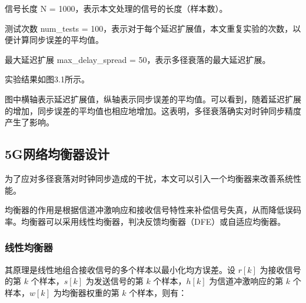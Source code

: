 \documentclass[UTF8,a4paper,12pt]{ctexart}
\numberwithin{equation}{section}
\begin{document}
	信号长度 N = 1000，表示本文处理的信号的长度（样本数）。
	
	测试次数 num\_tests = 100，表示对于每个延迟扩展值，本文重复实验的次数，以便计算同步误差的平均值。
	
	最大延迟扩展 max\_delay\_spread = 50，表示多径衰落的最大延迟扩展。
	
	实验结果如图3.1所示。
	\begin{figure}[htb] 
	\end{figure}
	
	图中横轴表示延迟扩展值，纵轴表示同步误差的平均值。可以看到，随着延迟扩展的增加，同步误差的平均值也相应地增加。这表明，多径衰落确实对时钟同步精度产生了影响。
	\subsection{5G网络均衡器设计}
	
	为了应对多径衰落对时钟同步造成的干扰，本文可以引入一个均衡器来改善系统性能。
	
	均衡器的作用是根据信道冲激响应和接收信号特性来补偿信号失真，从而降低误码率。均衡器可以采用线性均衡器，判决反馈均衡器（DFE）或自适应均衡器。
	\subsubsection{线性均衡器}
	其原理是线性地组合接收信号的多个样本以最小化均方误差。设 $r[k]$ 为接收信号的第 $k$ 个样本，$s[k]$ 为发送信号的第 $k$ 个样本，$h[k]$ 为信道冲激响应的第 $k$ 个样本，$w[k]$ 为均衡器权重的第 $k$ 个样本，则有：
	
\end{document}
